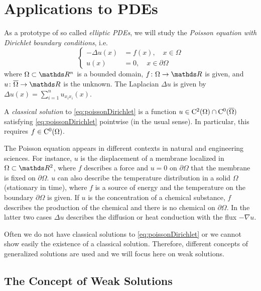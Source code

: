 \chapter{Applications to PDEs}
\label{chap:appsToPDEs}

As a prototype of so called \emph{elliptic PDEs}, we will study the \emph{Poisson equation with Dirichlet boundary conditions}, i.e.
\begin{equation}
  \label{eq:poissonDirichlet}
  \begin{cases}
    -\Delta u(x) &= f(x), \quad x \in \Omega \\
    u(x) &= 0, \quad x \in \partial\Omega
  \end{cases}
\end{equation}
where $\Omega \subset \R^n$ is a bounded domain, $f \colon \Omega \to \R$ is given, and $u \colon \overline \Omega \to \R$ is the unknown.
The Laplacian $\Delta u$ is given by $\Delta u(x) = \sum_{i = 1}^n u_{x_i x_i}(x)$.

\begin{defn}
  A \emph{classical solution} to \eqref{eq:poissonDirichlet} is a function $u \in \mathrm{C}^2(\Omega) \cap \mathrm{C}^0(\overline\Omega)$ satisfying \eqref{eq:poissonDirichlet} pointwise (in the usual sense).
  In particular, this requires $f \in \mathrm{C}^0(\Omega)$.
\end{defn}

  The Poisson equation appears in different contexts in natural and engineering sciences.
  For instance, $u$ is the displacement of a membrane localized in $\Omega \subset \R^2$, where $f$ describes a force and $u = 0$ on $\partial\Omega$ that the membrane is fixed on $\partial\Omega$.
  $u$ can also describe the temperature distribution in a solid $\Omega$ (stationary in time), where $f$ is a source of energy and the temperature on the boundary $\partial\Omega$ is given.
  If $u$ is the concentration of a chemical substance, $f$ describes the production of the chemical and there is no chemical on $\partial\Omega$.
  In the latter two cases $\Delta u$ describes the diffusion or heat conduction with the flux $-\nabla u$.

  Often we do not have classical solutions to \eqref{eq:poissonDirichlet} or we cannot show easily the existence of a classical solution.
  Therefore, different concepts of generalized solutions are used and we will focus here on weak solutions.

\section{The Concept of Weak Solutions}
\label{sec:weakSolutions}

